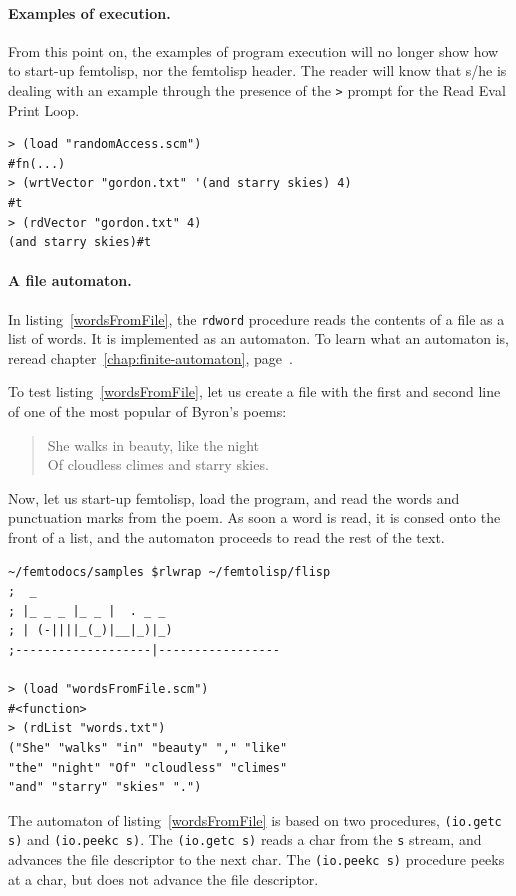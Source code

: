 \documentclass[a4paper,12pt]{book}
\begin{document}
\paragraph{Examples of execution.}
From this point on, the examples of
program execution will no longer
show how to start-up femtolisp, nor
the femtolisp header. The reader 
will know that s/he is dealing
with an example through the presence
of the \verb|>| prompt for the Read Eval Print Loop.
\begin{verbatim}
> (load "randomAccess.scm")
#fn(...)
> (wrtVector "gordon.txt" '(and starry skies) 4)
#t
> (rdVector "gordon.txt" 4)
(and starry skies)#t
\end{verbatim}

\paragraph{A file automaton.}
In listing~\ref{wordsFromFile},
the \verb|rdword| procedure reads the
contents of a file as a list of words. 
It is implemented as an
automaton. To learn what an automaton is,
reread chapter~\ref{chap:finite-automaton},
page~\pageref{chap:finite-automaton}.

To test listing~\ref{wordsFromFile}, let
us create a file with the first and
second line of one of the most
popular of Byron's poems:
\begin{quote}
She walks in beauty, like the night\\ 
Of cloudless climes and starry skies.
\end{quote}
Now, let us start-up femtolisp, load
the program, and read the words and
punctuation marks from the poem.
As soon a word is read, it is consed
onto the front of a list, and the automaton proceeds
to read the rest of the text.
\begin{verbatim}
~/femtodocs/samples $rlwrap ~/femtolisp/flisp
;  _
; |_ _ _ |_ _ |  . _ _
; | (-||||_(_)|__|_)|_)
;-------------------|-----------------

> (load "wordsFromFile.scm")
#<function>
> (rdList "words.txt")
("She" "walks" "in" "beauty" "," "like" 
"the" "night" "Of" "cloudless" "climes"
"and" "starry" "skies" ".")
\end{verbatim}

The automaton of listing~\ref{wordsFromFile} 
is based on two procedures, \verb|(io.getc s)| and
\verb|(io.peekc s)|. The \verb|(io.getc s)|
reads a char from the \verb|s| stream,
and advances the file descriptor to the
next char. The \verb|(io.peekc s)| procedure
peeks at a char, but does not advance the
file descriptor.
\end{document}
